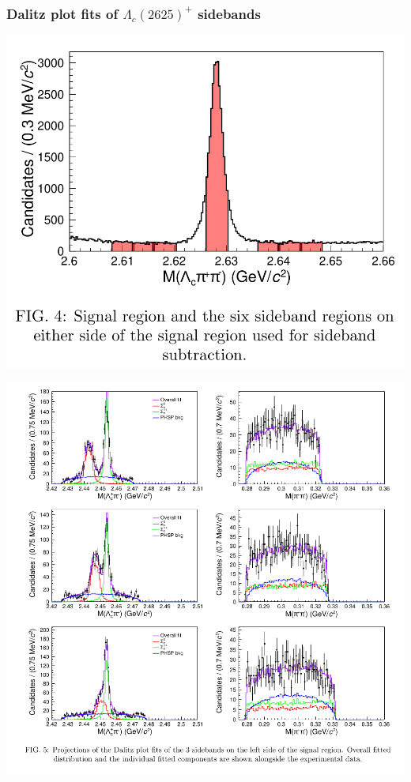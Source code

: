 \documentclass[10pt, aspectratio=169]{beamer}
\def\LcII{{\Lambda_c(2625)^+}}
\begin{document}
\begin{frame}[label=dalitz-lc2625-sidebands]%
  \frametitle{Dalitz plot fits of $\LcII$ sidebands}
  \parbox{.48\linewidth}{
    \includegraphics[width=\linewidth]{figures/005/fig2-004}
  } \parbox{.48\linewidth}{
    \includegraphics[width=\linewidth]{figures/005/fig2-005}
  }
\end{frame}%
\end{document}
